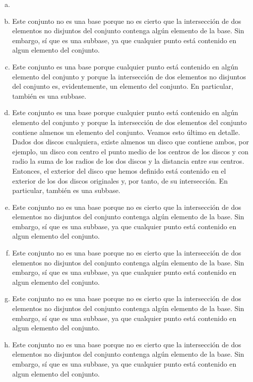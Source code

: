 \begin{eje}
    \begin{enumerate}[(a)] \item[]
        \item Este conjunto no es una base porque no es cierto que la intersección de dos elementos no disjuntos del conjunto contenga algún elemento de la base.  Sin embargo, sí que es una subbase, ya que cualquier punto está contenido en algun elemento del conjunto.
        \item Este conjunto es una base porque cualquier punto está contenido en algún elemento del conjunto y porque la intersección de dos elementos no disjuntos del conjunto es, evidentemente, un elemento del conjunto. En particular, también es una subbase.
        \item Este conjunto es una base porque cualquier punto está contenido en algún elemento del conjunto y porque la intersección de dos elementos del conjunto contiene almenos un elemento del conjunto. Veamos esto último en detalle. Dados dos discos cualquiera, existe almenos un disco que contiene ambos, por ejemplo, un disco con centro el punto medio de los centros de los discos y con radio la suma de los radios de los dos discos y la distancia entre sus centros. Entonces, el exterior del disco que hemos definido está contenido en el exterior de los dos discos originales y, por tanto, de su intersección. En particular, también es una subbase.
        \item Este conjunto no es una base porque no es cierto que la intersección de dos elementos no disjuntos del conjunto contenga algún elemento de la base.  Sin embargo, sí que es una subbase, ya que cualquier punto está contenido en algun elemento del conjunto.
        \item Este conjunto no es una base porque no es cierto que la intersección de dos elementos no disjuntos del conjunto contenga algún elemento de la base.  Sin embargo, sí que es una subbase, ya que cualquier punto está contenido en algun elemento del conjunto.
        \item Este conjunto no es una base porque no es cierto que la intersección de dos elementos no disjuntos del conjunto contenga algún elemento de la base.  Sin embargo, sí que es una subbase, ya que cualquier punto está contenido en algun elemento del conjunto.
        \item Este conjunto no es una base porque no es cierto que la intersección de dos elementos no disjuntos del conjunto contenga algún elemento de la base.  Sin embargo, sí que es una subbase, ya que cualquier punto está contenido en algun elemento del conjunto.
    \end{enumerate}
\end{eje}

